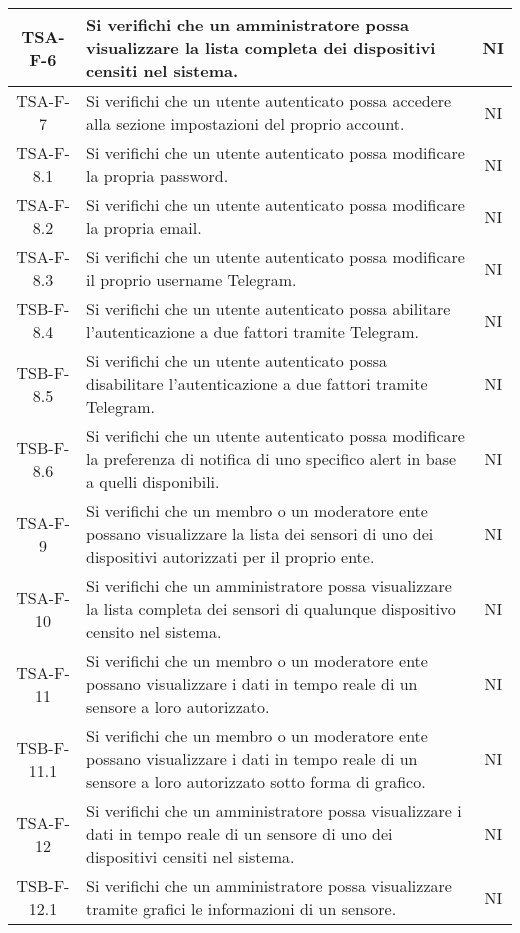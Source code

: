 \begin{center}
\begin{longtable}{|c|p{10cm}|c|}
			 \hline
			 TSA-F-6 & Si verifichi che un amministratore possa visualizzare la lista completa dei dispositivi censiti nel sistema. & NI \\
			 \hline
			 TSA-F-7 & Si verifichi che un utente autenticato possa accedere alla sezione impostazioni del proprio account. & NI \\
			 \hline
			 TSA-F-8.1 & Si verifichi che un utente autenticato possa modificare la propria password. & NI \\
			 \hline
			 TSA-F-8.2 & Si verifichi che un utente autenticato possa modificare la propria email. & NI \\
			 \hline
			 TSA-F-8.3 & Si verifichi che un utente autenticato possa modificare il proprio username Telegram. & NI \\
			 \hline
			 TSB-F-8.4 & Si verifichi che un utente autenticato possa abilitare l'autenticazione a due fattori tramite Telegram. & NI \\
			 \hline
			 TSB-F-8.5 & Si verifichi che un utente autenticato possa disabilitare l'autenticazione a due fattori tramite Telegram. & NI \\
			 \hline
			 TSB-F-8.6 & Si verifichi che un utente autenticato possa modificare la preferenza di notifica di uno specifico alert in base a quelli disponibili. & NI \\
			 \hline
			 TSA-F-9 & Si verifichi che un membro o un moderatore ente possano visualizzare la lista dei sensori di uno dei dispositivi autorizzati per il proprio ente. & NI \\
			 \hline
			 TSA-F-10 & Si verifichi che un amministratore possa visualizzare la lista completa dei sensori di qualunque dispositivo censito nel sistema. & NI \\
			 \hline
			 TSA-F-11 & Si verifichi che un membro o un moderatore ente possano visualizzare i dati in tempo reale di un sensore a loro autorizzato. & NI \\
			 \hline
			 TSB-F-11.1 & Si verifichi che un membro o un moderatore ente possano visualizzare i dati in tempo reale di un sensore a loro autorizzato sotto forma di grafico. & NI \\
			 \hline
			 TSA-F-12 & Si verifichi che un amministratore possa visualizzare i dati in tempo reale di un sensore di uno dei dispositivi censiti nel sistema. & NI \\
			 \hline
			 TSB-F-12.1 & Si verifichi che un amministratore possa visualizzare tramite grafici le informazioni di un sensore. & NI \\

\end{longtable}
\end{center}
